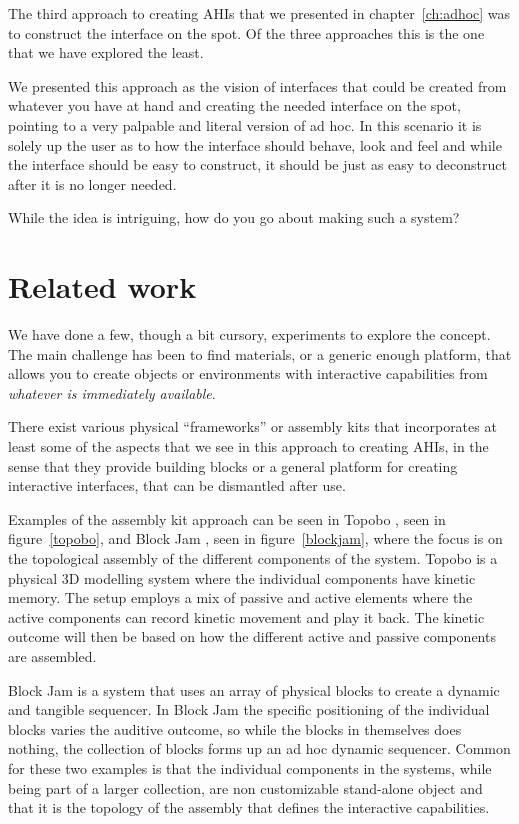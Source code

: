 \label{ch:prototype3}
The third approach to creating AHIs that we presented in chapter~\ref{ch:adhoc} was to construct the interface on the spot.
Of the three approaches this is the one that we have explored the least.

We presented this approach as the vision of interfaces that could be created from whatever you have at hand and creating the needed interface on the spot, pointing to a very palpable and literal version of ad hoc.
In this scenario it is solely up the user as to how the interface should behave, look and feel and while the interface should be easy to construct, it should be just as easy to deconstruct after it is no longer needed.

While the idea is intriguing, how do you go about making such a system?

\section{Related work}
We have done a few, though a bit cursory, experiments to explore the concept.
The main challenge has been to find materials, or a generic enough platform, that allows you to create objects or environments with interactive capabilities from \emph{whatever is immediately available}. 

There exist various physical ``frameworks'' or assembly kits that incorporates at least some of the aspects that we see in this approach to creating AHIs, in the sense that they provide building blocks or a general platform for creating interactive interfaces, that can be dismantled after use.

Examples of the assembly kit approach can be seen in Topobo \citep{raffle2004topobo}, seen in figure~\ref{topobo}, and Block Jam \citep{newton2003block}, seen in figure~\ref{blockjam}, where the focus is on the topological assembly of the different components of the system. 
Topobo is a physical 3D modelling system where the individual components have kinetic memory. 
The setup employs a mix of passive and active elements where the active components can record kinetic movement and play it back.
The kinetic outcome will then be based on how the different active and passive components are assembled.

Block Jam is a system that uses an array of physical blocks to create a dynamic and tangible sequencer.
In Block Jam the specific positioning of the individual blocks varies the auditive outcome, so while the blocks in themselves does nothing, the collection of blocks forms up an ad hoc dynamic sequencer.
Common for these two examples is that the individual components in the systems, while being part of a larger collection, are non customizable stand-alone object and that it is the topology of the assembly that defines the interactive capabilities.


